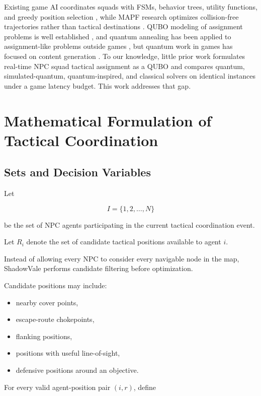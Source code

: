\documentclass[12pt, a4paper]{article}
\begin{document}
Existing game AI coordinates squads with FSMs, behavior trees, utility functions, and greedy position selection \cite{Orkin2006,Straatman2005,Yannakakis2018}, while MAPF research optimizes collision-free trajectories rather than tactical destinations \cite{Sharon2015}. QUBO modeling of assignment problems is well established \cite{Lucas2014,Glover2019}, and quantum annealing has been applied to assignment-like problems outside games \cite{Neukart2017}, but quantum work in games has focused on content generation \cite{Wootton2020}. To our knowledge, little prior work formulates real-time NPC squad tactical assignment as a QUBO and compares quantum, simulated-quantum, quantum-inspired, and classical solvers on identical instances under a game latency budget. This work addresses that gap.

\section*{Mathematical Formulation of Tactical Coordination}

\subsection*{Sets and Decision Variables}

Let

$$
I=\{1,2,\ldots,N\}
$$

be the set of NPC agents participating in the current tactical coordination event.

Let $R_i$ denote the set of candidate tactical positions available to agent $i$.

Instead of allowing every NPC to consider every navigable node in the map, ShadowVale performs candidate filtering before optimization.

Candidate positions may include:

\begin{itemize}
\item nearby cover points,
\item escape-route chokepoints,
\item flanking positions,
\item positions with useful line-of-sight,
\item defensive positions around an objective.
\end{itemize}

For every valid agent-position pair $(i,r)$, define
\end{document}
